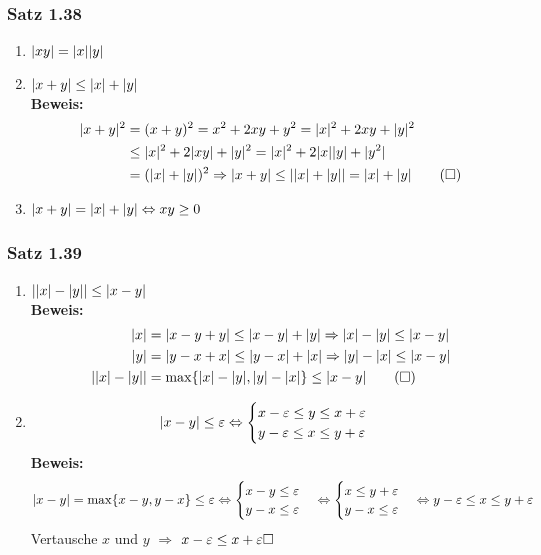 \documentclass[a4paper]{scrartcl}
\DeclarePairedDelimiter\abs{\lvert}{\rvert}%
\begin{document}
\subsubsection{Satz 1.38}
\label{sec-2-9-6}
\begin{enumerate}
\item $\abs{x y} = \abs{x} \abs{y}$
\item $\abs{x + y} \leq \abs{x} + \abs{y}$ \\
       \textbf{Beweis:} \\
\begin{align}
\abs{x + y}^2 &= (x+y)^2 = x^2 + 2x y + y^2 = \abs{x}^2 + 2xy + \abs{y}^2 \\
&\leq \abs{x}^2 + 2\abs{x y} + \abs{y}^2 = \abs{x}^2 + 2\abs{x}\abs{y} + \abs{y^2} \\
&= (\abs{x} + \abs{y})^2 \Rightarrow \abs{x + y} \leq \abs{\abs{x} + \abs{y}} = \abs{x} + \abs{y} \tag{$\square$}
\end{align}
\item $\abs{x + y} = \abs{x} + \abs{y} \Leftrightarrow x y \geq 0$
\end{enumerate}
\subsubsection{Satz 1.39}
\label{sec-2-9-7}
\begin{enumerate}
\item $\abs{\abs{x} - \abs{y}} \leq \abs{x - y}$ \\
       \textbf{Beweis:} \\
\begin{align}
\abs{x} &= \abs{x - y + y} \leq \abs{x - y} + \abs{y} \Rightarrow \abs{x} - \abs{y} \leq \abs{x - y} \\
\abs{y} &= \abs{y - x + x} \leq \abs{y - x} + \abs{x} \Rightarrow \abs{y} - \abs{x} \leq \abs{x - y} \\
\abs{\abs{x} - \abs{y}} &= \max \{\abs{x} - \abs{y},\abs{y} - \abs{x}\} \leq \abs{x - y} \tag{$\square$}
\end{align}
\item \[\abs{x - y} \leq \varepsilon \Leftrightarrow \begin{cases} x - \varepsilon \leq y \leq x + \varepsilon \\ y - \varepsilon \leq x \leq y + \varepsilon \end{cases}\]
       \textbf{Beweis:} \\
\begin{align}
\abs{x - y} = \max\{x - y , y - x\} \leq \varepsilon \Leftrightarrow \begin{cases} x - y \leq \varepsilon \\ y - x \leq \varepsilon\end{cases} \Leftrightarrow \begin{cases} x \leq y + \varepsilon \\ y - x \leq \varepsilon \end{cases} \Leftrightarrow y - \varepsilon \leq x \leq y + \varepsilon
\end{align}
Vertausche $x$ und $y$ $\Rightarrow$ $x - \varepsilon \leq x + \varepsilon \hfill \square$
\end{enumerate}
\end{document}
